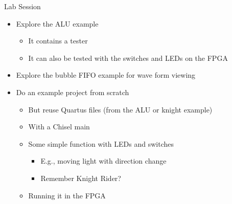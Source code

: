 \begin{frame}[fragile]{Lab Session}
\begin{itemize}
\item Explore the ALU example
\begin{itemize}
\item It contains a tester
\item It can also be tested with the switches and LEDs on the FPGA
\end{itemize}
\item Explore the bubble FIFO example for wave form viewing
\item Do an example project from scratch
\begin{itemize}
\item But reuse Quartus files (from the ALU or knight example)
\item With a Chisel main
\item Some simple function with LEDs and switches
\begin{itemize}
\item E.g., moving light with direction change
\item Remember Knight Rider?
\end{itemize}
\item Running it in the FPGA
\end{itemize}
\end{itemize}
\end{frame}

